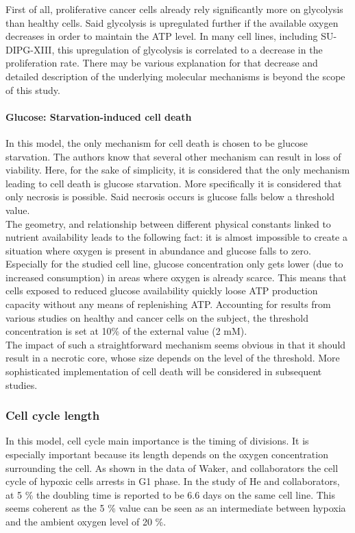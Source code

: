 \documentclass[11pt,a4paper]{article}
\begin{document}
First of all, proliferative cancer cells already rely significantly more on glycolysis than healthy cells.\cite{Shen2020}\cite{Ruas2018}\cite{Berg2006} Said glycolysis is upregulated further if the available oxygen decreases in order to maintain the ATP level.\cite{Kierans2020} In many cell lines, including SU-DIPG-XIII, this upregulation of glycolysis is correlated to a decrease in the proliferation rate. There may be various explanation for that decrease and detailed description of the underlying molecular mechanisms is beyond the scope of this study.\\

\paragraph{Glucose: Starvation-induced cell death}
In this model, the only mechanism for cell death is chosen to be glucose starvation. The authors know that several other mechanism can result in loss of viability. Here, for the sake of simplicity, it is considered that the only mechanism leading to cell death is glucose starvation. More specifically it is considered that only necrosis is possible. Said necrosis occurs is glucose falls below a threshold value.\\

The geometry, and relationship between different physical constants linked to nutrient availability leads to the following fact: it is almost impossible to create a situation where oxygen is present in abundance and glucose falls to zero. Especially for the studied cell line, glucose concentration only gets lower (due to increased consumption) in areas where oxygen is already scarce. This means that cells exposed to reduced glucose availability quickly loose ATP production capacity without any means of replenishing ATP. Accounting for results from various studies on healthy and cancer cells on the subject,\cite{Lieberthal1998}\cite{Why1999}\cite{Yee2021}  the threshold concentration is set at 10\% of the external value (2 mM).\\

The impact of such a straightforward mechanism seems obvious in that it should result in a necrotic core, whose size depends on the level of the threshold. More sophisticated implementation of cell death will be considered in subsequent studies.\\

\subsubsection{Cell cycle length}
In this model, cell cycle main importance is the timing of divisions. It is especially important because its length depends on the oxygen concentration surrounding the cell. As shown in the data of Waker, and collaborators the cell cycle of hypoxic cells arrests in G1 phase.\cite{Waker2018} In the study of He and collaborators, at 5 \% the doubling time is reported to be 6.6 days on the same cell line.\cite{He2021} This seems coherent as the 5 \% value can be seen as an intermediate between hypoxia and the ambient oxygen level of 20 \%.\\
\end{document}
